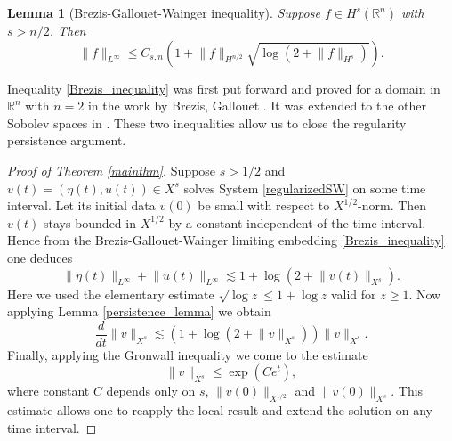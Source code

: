 \documentclass[reqno,12pt,a4paper]{article}
\theoremstyle{plain}
\newtheorem{lemma}[theorem]{\bf Lemma}
\begin{document}
\begin{lemma}
[Brezis-Gallouet-Wainger inequality]
\label{Brezis_lemma}
	Suppose $f \in H^s(\mathbb R^n)$ with $s > n / 2$.
	Then
	\begin{equation}
	\label{Brezis_inequality}
		\lVert f \rVert_{L^{\infty}}
		\leqslant
		C_{s, n}
		\left(
			1 + \lVert f \rVert_{H^{n/2}}
			\sqrt{ \log( 2 + \lVert f \rVert_{H^s} ) }
		\right)
		.
	\end{equation}
\end{lemma}


Inequality \eqref{Brezis_inequality} was first put forward
and proved for a domain in $\mathbb R^n$ with $n = 2$
in the work by Brezis, Gallouet
\cite{Brezis_Gallouet}.
It was extended to the other Sobolev spaces in
\cite{Brezis_Wainger}.
These two inequalities allow us to close
the regularity persistence argument.


\begin{proof}[Proof of Theorem \ref{mainthm}]
%
%
Suppose $s > 1/2$ and
$v(t) = ( \eta(t), u(t) ) \in X^s$ solves
System \eqref{regularizedSW} on some time interval.
Let its initial data $v(0)$ be small
with respect to $X^{1/2}$-norm.
Then $v(t)$ stays bounded in $X^{1/2}$
by a constant independent of the time interval.
Hence from the Brezis-Gallouet-Wainger limiting embedding
\eqref{Brezis_inequality} one deduces
\[
	\lVert \eta(t) \rVert _{L^{\infty}}
	+
	\lVert u(t) \rVert _{L^{\infty}}
	\lesssim 1 +
	\log \left( 2 + \lVert v(t) \rVert _{X^s} \right)
    .
\]
Here we used the elementary estimate $\sqrt{\log z} \leqslant 1 + \log z$
valid for $z \geqslant 1$.
Now applying Lemma \ref{persistence_lemma} we obtain
%
\[
	\frac{d}{dt} \lVert v \rVert _{X^s}
	\lesssim
	\left(
		1 +
		\log \left( 2 + \lVert v \rVert _{X^s} \right)
	\right)
	\lVert v \rVert _{X^s}
	.
\]
%
Finally, applying the Gronwall inequality we come to the estimate
%
\[
	\lVert v \rVert _{X^s}
	\leqslant
	\exp
	\left(
		C e^t
	\right)
	,
\]
%
where constant $C$ depends only on $s$,
$\lVert v(0) \rVert _{X^{1/2}}$ and
$\lVert v(0) \rVert _{X^s}$.
This estimate allows one to reapply the
local result and extend the solution on any time interval.
%
%
\end{proof}


\end{document}
